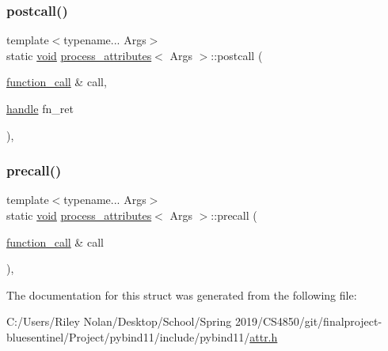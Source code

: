 \mbox{\label{structprocess__attributes_add46fd700add3f95c2175d9da79ceb86}} 
\subsubsection{\texorpdfstring{postcall()}{postcall()}}
{\footnotesize\ttfamily template$<$typename... Args$>$ \\
static \mbox{\hyperlink{_s_d_l__opengles2__gl2ext_8h_ae5d8fa23ad07c48bb609509eae494c95}{void}} \mbox{\hyperlink{structprocess__attributes}{process\+\_\+attributes}}$<$ Args $>$\+::postcall (\begin{DoxyParamCaption}\item[{\mbox{\hyperlink{structfunction__call}{function\+\_\+call}} \&}]{call,  }\item[{\mbox{\hyperlink{classhandle}{handle}}}]{fn\+\_\+ret }\end{DoxyParamCaption})\hspace{0.3cm}{\ttfamily [inline]}, {\ttfamily [static]}}

\mbox{\label{structprocess__attributes_a2b4b705a56f8d0e65fa269837f8cd148}} 
\subsubsection{\texorpdfstring{precall()}{precall()}}
{\footnotesize\ttfamily template$<$typename... Args$>$ \\
static \mbox{\hyperlink{_s_d_l__opengles2__gl2ext_8h_ae5d8fa23ad07c48bb609509eae494c95}{void}} \mbox{\hyperlink{structprocess__attributes}{process\+\_\+attributes}}$<$ Args $>$\+::precall (\begin{DoxyParamCaption}\item[{\mbox{\hyperlink{structfunction__call}{function\+\_\+call}} \&}]{call }\end{DoxyParamCaption})\hspace{0.3cm}{\ttfamily [inline]}, {\ttfamily [static]}}



The documentation for this struct was generated from the following file\+:\begin{DoxyCompactItemize}
\item 
C\+:/\+Users/\+Riley Nolan/\+Desktop/\+School/\+Spring 2019/\+C\+S4850/git/finalproject-\/bluesentinel/\+Project/pybind11/include/pybind11/\mbox{\hyperlink{attr_8h}{attr.\+h}}\end{DoxyCompactItemize}
